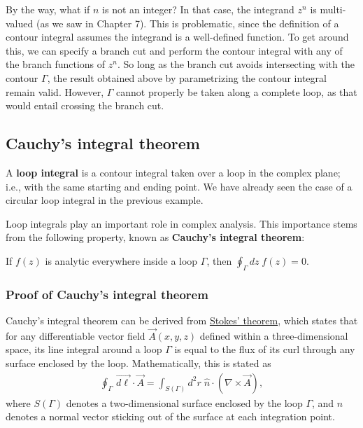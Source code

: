 \documentclass[10pt,a4paper]{article}
\begin{document}
By the way, what if $n$ is not an integer? In that case, the integrand
$z^n$ is multi-valued (as we saw in Chapter 7). This is problematic,
since the definition of a contour integral assumes the integrand is a
well-defined function. To get around this, we can specify a branch cut
and perform the contour integral with any of the branch functions of
$z^n$. So long as the branch cut avoids intersecting with the contour
$\Gamma$, the result obtained above by parametrizing the contour
integral remain valid.  However, $\Gamma$ cannot properly be taken
along a complete loop, as that would entail crossing the branch cut.

\subsection{Cauchy's integral theorem}
\label{cauchys-integral-theorem}

A \textbf{loop integral} is a contour integral taken over a loop in
the complex plane; i.e., with the same starting and ending point. We
have already seen the case of a circular loop integral in the previous
example.

Loop integrals play an important role in complex analysis. This
importance stems from the following property, known as
\textbf{Cauchy's integral theorem}:

\begin{framed}
If $f(z)$ is analytic everywhere inside a loop $\Gamma$, then $\displaystyle\oint_\Gamma dz\; f(z) = 0.$
\end{framed}

\subsubsection{Proof of Cauchy's integral theorem}
\label{proof-of-cauchys-integral-theorem}

Cauchy's integral theorem can be derived from
\href{http://en.wikipedia.org/wiki/Stokes'_theorem}{Stokes' theorem},
which states that for any differentiable vector field $\vec{A}(x,y,z)$
defined within a three-dimensional space, its line integral around a
loop $\Gamma$ is equal to the flux of its curl through any surface
enclosed by the loop.  Mathematically, this is stated as
\begin{align}
  \oint_\Gamma\, \vec{d\ell} \cdot \vec{A} = \int_{S(\Gamma)} d^2r \; \hat{n} \cdot \left(\nabla \times \vec{A}\right),
\end{align}
where $S(\Gamma)$ denotes a two-dimensional surface enclosed by the
loop $\Gamma$, and $\hat{n}$ denotes a normal vector sticking out of
the surface at each integration point.
\end{document}

